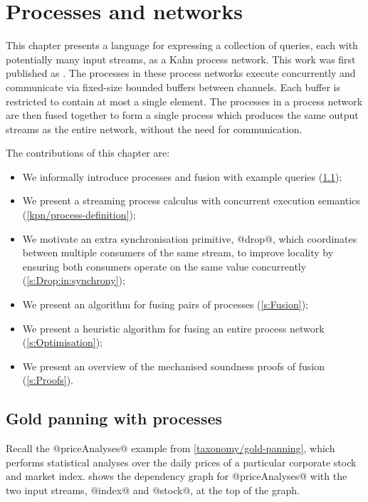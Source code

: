 \chapter{Processes and networks}
\label{chapter:process:processes}

This chapter presents a language for expressing a collection of queries, each with potentially many input streams, as a Kahn process network.
This work was first published as \citep{robinson2017machine}.
The processes in these process networks execute concurrently and communicate via fixed-size bounded buffers between channels.
Each buffer is restricted to contain at most a single element.
The processes in a process network are then fused together to form a single process which produces the same output streams as the entire network, without the need for communication.

The contributions of this chapter are:
\begin{itemize}
\item
We informally introduce processes and fusion with example queries (\cref{kpn/gold-panning});
\item
We present a streaming process calculus with concurrent execution semantics (\cref{kpn/process-definition});
\item
We motivate an extra synchronisation primitive, @drop@, which coordinates between multiple consumers of the same stream, to improve locality by ensuring both consumers operate on the same value concurrently
(\cref{s:Drop:in:synchrony});
\item
We present an algorithm for fusing pairs of processes (\cref{s:Fusion});
\item
We present a heuristic algorithm for fusing an entire process network (\cref{s:Optimisation});
\item
We present an overview of the mechanised soundness proofs of fusion (\cref{s:Proofs}).
\end{itemize}



\section{Gold panning with processes}
\label{kpn/gold-panning}
Recall the @priceAnalyses@ example from \cref{taxonomy/gold-panning}, which performs statistical analyses over the daily prices of a particular corporate stock and market index.
 shows the dependency graph for @priceAnalyses@ with the two input streams, @index@ and @stock@, at the top of the graph.

